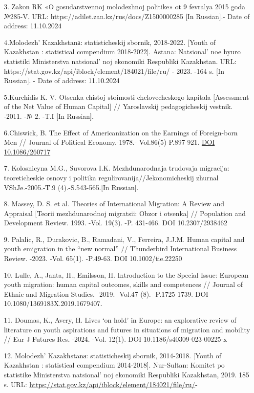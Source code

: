 {3. Zakon RK «O gosudarstvennoj molodezhnoj politike» ot 9 fevralya 2015
goda №285-V. URL: https://adilet.zan.kz/rus/docs/Z1500000285 {[}In
Russian{]}.- Date of address: 11.10.2024

4.Molodezh'{} Kazakhstanа: statisticheskij sbornik,
2018-2022. {[}Youth of Kazakhstan : statistical compendium 2018-2022{]}.
Astana: Natsional' noe byuro statistiki Ministerstva
natsional' noj ekonomiki Respubliki Kazakhstan. URL:
https://stat.gov.kz/api/iblock/element/184021/file/ru/ - 2023. -164 s.
{[}In Russian{]}. - Date of address: 11.10.2024

5.Kurchidis K. V. Otsenka chistoj stoimosti chelovecheskogo kapitala
{[}Assessment of the Net Value of Human Capital{]} // Yaroslavskij
pedagogicheskij vestnik. -2011. -№ 2. -T.I {[}In Russian{]}.

6.Chiswick, B. The Effect of Americanization on the Earnings of
Foreign-born Men // Journal of Political Economy.-1978.-
Vol.86(5)-P.897-921.
\href{https://econpapers.repec.org/scripts/redir.pf?u=http\%3A\%2F\%2Fdx.doi.org\%2F10.1086\%2F260717;h=repec:ucp:jpolec:v:86:y:1978:i:5:p:897-921}{DOI
10.1086/260717}~

7. Kolosnicyna M.G., Suvorova I.K. Mezhdunarodnaja trudovaja migracija:
teoreticheskie osnovy i politika regulirovanija//Jekonomicheskij zhurnal
VShJe.-2005.-T.9 (4).-S.543-565.{[}In Russian{]}.

8. Massey, D. S. et al. Theories of International Migration: A Review
and Appraisal {[}Teorii mezhdunarodnoj migratsii: Obzor i otsenka{]} //
Population and Development Review. 1993. -Vol. 19(3). -P. 431-466. DOI
10.2307/2938462

9. Palalic, R., Durakovic, B., Ramadani, V., Ferreira, J.J.M. Human
capital and youth emigration in the ``new normal'' // Thunderbird
International Business Review. -2023. -Vol. 65(1). -P.49-63. DOI
10.1002/tie.22250

10. Lulle, A., Janta, H., Emilsson, H. Introduction to the Special
Issue: European youth migration: human capital outcomes, skills and
competences // Journal of Ethnic and Migration Studies. -2019. -Vol.47
(8). -P.1725-1739. DOI 10.1080/1369183X.2019.1679407.

11. Doumas, K., Avery, H. Lives `on hold' in Europe: an explorative
review of literature on youth aspirations and futures in situations of
migration and mobility // Eur J Futures Res. -2024. -Vol. 12(1). DOI
10.1186/s40309-023-00225-x

12. Molodezh'{} Kazakhstanа: statisticheskij sbornik,
2014-2018. {[}Youth of Kazakhstan : statistical compendium 2014-2018{]}.
Nur-Sultan: Komitet po statistike Ministerstva
natsional' noj ekonomiki Respubliki Kazakhstan, 2019. 185
s. URL: \url{https://stat.gov.kz/api/iblock/element/184021/file/ru/}-

}

